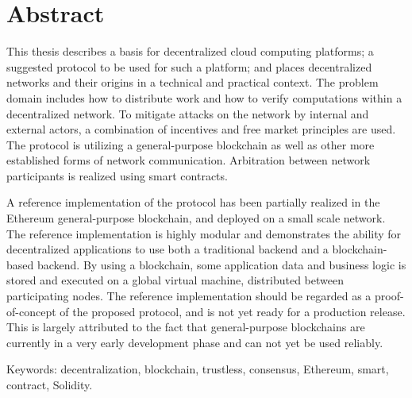 
\thispagestyle{plain}			%
\section*{Abstract}
This thesis describes a basis for decentralized cloud computing platforms; a suggested protocol to be used for such a platform; and places decentralized networks and their origins in a technical and practical context. The problem domain includes how to distribute work and how to verify computations within a decentralized network. To mitigate attacks on the network by internal and external actors, a combination of incentives and free market principles are used. The protocol is utilizing a general-purpose blockchain as well as other more established forms of network communication. Arbitration between network participants is realized using smart contracts.

A reference implementation of the protocol has been partially realized in the Ethereum general-purpose blockchain, and deployed on a small scale network. The reference implementation is highly modular and demonstrates the ability for decentralized applications to use both a traditional backend and a blockchain-based backend. By using a blockchain, some application data and business logic is stored and executed on a global virtual machine, distributed between participating nodes. The reference implementation should be regarded as a proof-of-concept of the proposed protocol, and is not yet ready for a production release. This is largely attributed to the fact that general-purpose blockchains are currently in a very early development phase and can not yet be used reliably.


\vfill
\noindent Keywords: decentralization, blockchain, trustless, consensus, Ethereum, smart, \\contract, Solidity. 

\newpage				%
\thispagestyle{empty}
\mbox{}